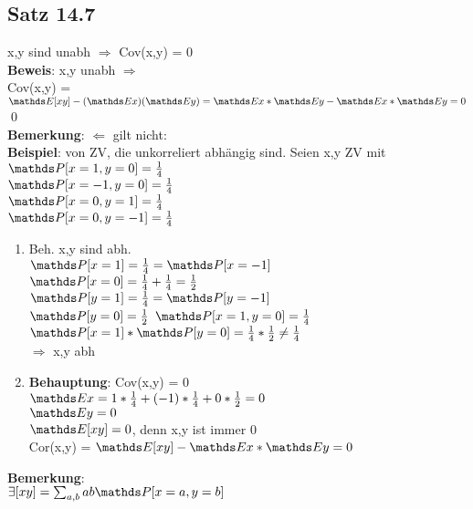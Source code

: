 \subsection{Satz 14.7}
x,y sind unabh $ \Rightarrow $ Cov(x,y) = 0\smallskip\\
\textbf{Beweis}: x,y unabh $\Rightarrow$\smallskip\\
Cov(x,y) = $\E[xy]-(\E x)(\E y) = \E x * \E y - \E x * \E y = 0$\qed\medskip\\
\textbf{Bemerkung}: $\Leftarrow $ gilt nicht:\\
\textbf{Beispiel}: von ZV, die unkorreliert abhängig sind. Seien x,y ZV mit\smallskip\\ $\PP[x=1, y=0]=\frac{1}{4}$\smallskip\\
$\PP[x=-1, y=0]=\frac{1}{4}$\smallskip\\
$\PP[x=0, y=1]=\frac{1}{4}$\smallskip\\
$\PP[x=0, y=-1]=\frac{1}{4}$\smallskip\\
\begin{enumerate}
	\item Beh. x,y sind abh.\\
	$\PP[x=1]=\frac{1}{4}=\PP[x=-1]$\smallskip\\
	$\PP[x=0] = \frac{1}{4}+\frac{1}{4}=\frac{1}{2}$\smallskip\\
	$\PP[y=1] = \frac{1}{4} = \PP[y=-1]$\smallskip\\
	$\PP[y=0] = \frac{1}{2}$\smallskip
	$\PP[x=1,y=0] = \frac{1}{4}$\smallskip\\
	$\PP[x=1]*\PP[y=0] = \frac{1}{4}*\frac{1}{2} \neq \frac{1}{4}$\medskip\\
	$\Rightarrow$ x,y abh
	\item \textbf{Behauptung}: Cov(x,y) = 0\smallskip\\
	$\E x = 1 * \frac{1}{4}+(-1)*\frac{1}{4}+0*\frac{1}{2}=0$\smallskip\\
	$\E y = 0$\smallskip\\
	$\E[xy] = 0$, denn x,y ist immer 0 \medskip\\
	Cor(x,y) = $\E[xy]-\E x * \E y = 0$
	\end{enumerate}
\textbf{Bemerkung}:\\\begin{math}
\exists[xy]=\sum_{a,b}ab\PP[x=a,y=b]\smallskip\\
\end{math}